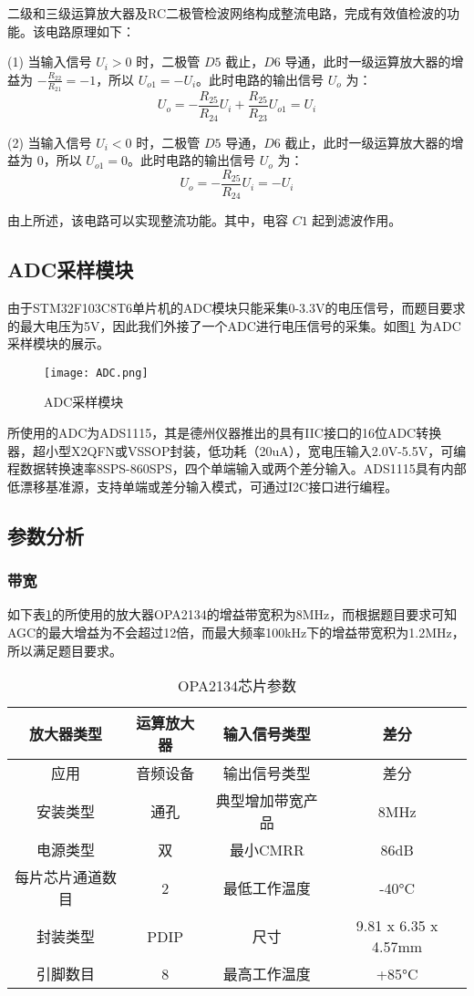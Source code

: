 \documentclass[lang=cn,11pt,a4paper]{elegantpaper}
\begin{document}
二级和三级运算放大器及RC二极管检波网络构成整流电路，完成有效值检波的功能。该电路原理如下：

(1) 当输入信号 \( U_i > 0 \) 时，二极管 \( D5 \) 截止，\( D6 \) 导通，此时一级运算放大器的增益为 \( -\frac{R_22}{R_21} = -1 \)，所以 \( U_{o1} = -U_i \)。此时电路的输出信号 \( U_o \) 为：
\[
  U_o = -\frac{R_25}{R_24} U_i + \frac{R_25}{R_23} U_{o1} = U_i
\]

(2) 当输入信号 \( U_i < 0 \) 时，二极管 \( D5 \) 导通，\( D6 \) 截止，此时一级运算放大器的增益为 0，所以 \( U_{o1} = 0 \)。此时电路的输出信号 \( U_o \) 为：
\[
  U_o = -\frac{R_25}{R_24} U_i = -U_i
\]

由上所述，该电路可以实现整流功能。其中，电容 \( C1 \) 起到滤波作用。

\subsection{ADC采样模块}
由于STM32F103C8T6单片机的ADC模块只能采集0-3.3V的电压信号，而题目要求的最大电压为5V，因此我们外接了一个ADC进行电压信号的采集。如图\ref{fig:adc_sampling} 为ADC采样模块的展示。

\begin{figure}[!htb]
  \centering
  \texttt{[image: ADC.png]}
  \caption{ADC采样模块}
  \label{fig:adc_sampling}
\end{figure}

所使用的ADC为ADS1115，其是德州仪器推出的具有IIC接口的16位ADC转换器，超小型X2QFN或VSSOP封装，低功耗（20uA），宽电压输入2.0V-5.5V，可编程数据转换速率8SPS-860SPS，四个单端输入或两个差分输入。ADS1115具有内部低漂移基准源，支持单端或差分输入模式，可通过I2C接口进行编程。

\subsection{参数分析}
\subsubsection{带宽}
如下表\ref{tab:OPA2134}的所使用的放大器OPA2134的增益带宽积为8MHz，而根据题目要求可知AGC的最大增益为不会超过12倍，而最大频率100kHz下的增益带宽积为1.2MHz，所以满足题目要求。
\begin{table}[!ht]
  \centering
  \caption{OPA2134芯片参数}
  \begin{tabular}{|c|c|c|c|}
  \hline
      放大器类型 & 运算放大器 & 输入信号类型 & 差分  \\ \hline
      应用 & 音频设备 & 输出信号类型 & 差分  \\ \hline
      安装类型 & 通孔 & 典型增加带宽产品 & 8MHz  \\ \hline
      电源类型 & 双 & 最小CMRR & 86dB  \\ \hline
      每片芯片通道数目 & 2 & 最低工作温度 & -40°C  \\ \hline
      封装类型 & PDIP & 尺寸 & 9.81 x 6.35 x 4.57mm  \\ \hline
      引脚数目 & 8 & 最高工作温度 & +85°C \\ \hline
  \end{tabular}
  \label{tab:OPA2134}
\end{table}
\end{document}
